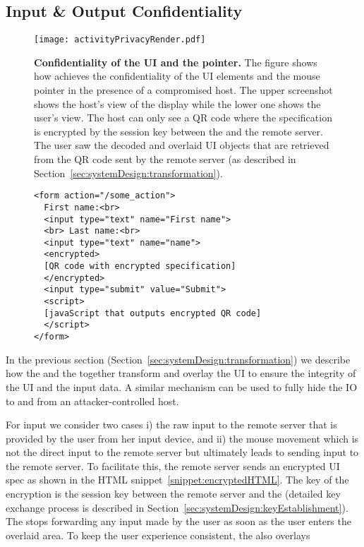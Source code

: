 \subsection{Input \& Output Confidentiality}
\label{sec:systemDesign:mousePrivacy}


\begin{figure}[t]
\centering
\texttt{[image: activityPrivacyRender.pdf]}
\caption{\textbf{Confidentiality of the UI and the pointer.} The figure shows how \name achieves the confidentiality of the UI elements and the mouse pointer in the presence of a compromised host. The upper screenshot shows the host's view of the display while the lower one shows the user's view. The host can only see a QR code where the specification is encrypted by the \tls session key between the \device and the remote server. The user saw the decoded and overlaid UI objects that are retrieved from the QR code sent by the remote server (as described in Section~\ref{sec:systemDesign:transformation}).}
\label{fig:activityPrivacy}
\centering
\end{figure}


\begin{figure}[t]
\small
\begin{lstlisting}[mathescape=true]
<form action="/some_action">
  First name:<br>
  <input type="text" name="First name">
  <br> Last name:<br>
  <input type="text" name="name">
  <encrypted>
  [QR code with encrypted specification]
  </encrypted>
  <input type="submit" value="Submit">
  <script>
  [javaScript that outputs encrypted QR code]
  </script>
</form> 
\end{lstlisting} 
\end{figure}

In the previous section (Section~\ref{sec:systemDesign:transformation}) we describe how the \name \js and the \device together transform and overlay the UI to ensure the integrity of the UI and the input data. A similar mechanism can be used to fully hide the IO to and from an attacker-controlled host. 

For input we consider two cases i) the raw input to the remote server that is provided by the user from her input device, and ii) the mouse movement which is not the direct input to the remote server but ultimately leads to sending input to the remote server. To facilitate this, the remote server sends an encrypted UI spec as shown in the HTML snippet~\ref{snippet:encryptedHTML}. The key of the encryption is the session \tls key between the remote server and the \device (detailed key exchange process is described in Section~\ref{sec:systemDesign:keyEstablishment}). The \device stops forwarding any input made by the user as soon as the user enters the overlaid area. To keep the user experience consistent, the \device also overlays  

